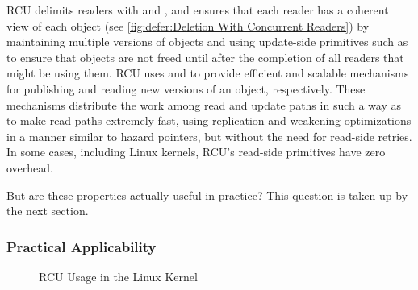 RCU delimits readers with  and ,
and ensures that each reader has a coherent view of each object
(see \cref{fig:defer:Deletion With Concurrent Readers}) by
maintaining multiple versions of objects and using update-side primitives
such as  to ensure that objects are not
freed until after the completion of all readers that might be using them.
RCU uses  and  to provide
efficient and scalable mechanisms for publishing and reading new versions
of an object, respectively.
These mechanisms distribute the work among read and
update paths in such a way as to make read paths extremely fast, using
replication and weakening optimizations in a manner similar to
hazard pointers, but without the need for read-side retries.
In some cases, including  Linux kernels,
RCU's read-side primitives have zero overhead.

But are these properties actually useful in practice?
This question is taken up by the next section.

\subsubsection{Practical Applicability}
\label{sec:defer:Practical Applicability}

\begin{figure}[tb]
\centering
{}
\caption{RCU Usage in the Linux Kernel}
\label{fig:defer:RCU Usage in the Linux Kernel}
\end{figure}

